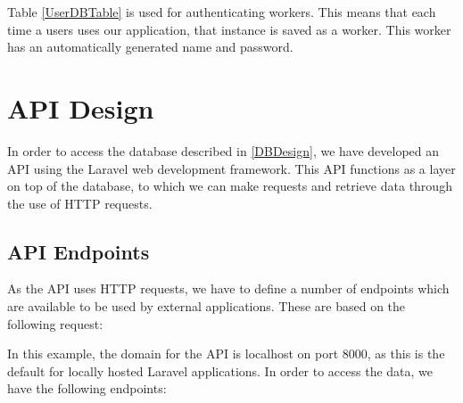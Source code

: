 Table \autoref{UserDBTable} is used for authenticating workers. This
means that each time a users uses our application, that instance is saved
as a worker. This worker has an automatically generated name and password.

\section{\ac{API} Design}
In order to access the database described in \autoref{DBDesign}, we have
developed an \ac{API} using the Laravel web development framework. This \ac{API} functions
as a layer on top of the database, to which we can make requests and retrieve
data through the use of \ac{HTTP} requests.

\subsection{\ac{API} Endpoints}
As the \ac{API} uses \ac{HTTP} requests, we have to define a number of
endpoints which are available to be used by external applications. These are based on the following
request:\nl

\nl

In this example, the domain for the \ac{API} is localhost on port 8000, as this is
the default for locally hosted Laravel applications. In order to access the
data, we have the following endpoints:

